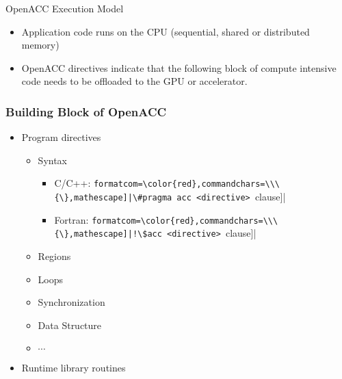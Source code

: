 \documentclass[c,mathserif,compress,xcolor=svgnames]{beamer}
\newcommand{\Verbred}[1]{\Verb[formatcom=\color{red},commandchars=\\\{\},mathescape]|#1|}
\newenvironment{eblock}[0]
{
\begin{beamerboxesrounded}[upper=uppercol2,lower=lowercol2,shadow=true]}
{\end{beamerboxesrounded}}
\begin{document}
\begin{frame}{\small OpenACC Execution Model}
  \begin{eblock}{}
    \begin{itemize}
      \item Application code runs on the CPU (sequential, shared or distributed memory)
      \item OpenACC directives indicate that the following block of compute intensive code needs to be offloaded to the GPU or accelerator.
    \end{itemize}
    \vspace{-0.5cm}
    
  \end{eblock}
\end{frame}

\begin{frame}[fragile]
  \frametitle{\small Building Block of OpenACC}
  \begin{eblock}{}
    \begin{itemize}
      \item Program directives
        \begin{itemize}
          \item Syntax
            \begin{itemize}
              \item C/C++: \Verbred{\#pragma acc <directive> [clause]}
              \item Fortran: \Verbred{!\$acc <directive> [clause]}
            \end{itemize}
          \item Regions
          \item Loops
          \item Synchronization
          \item Data Structure
          \item $\cdots$
        \end{itemize}
      \item Runtime library routines
    \end{itemize}
  \end{eblock}
\end{frame}
\end{document}
